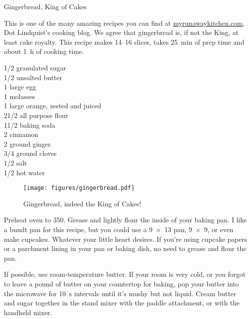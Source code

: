 \begin{entry}{Gingerbread, King of Cakes}

\begin{open}
    This is one of the many amazing recipes you can find at
    \url{myrunawaykitchen.com}, Dot Lindquist's cooking blog.  We agree that
    gingerbread is, if not the King, at least cake royalty.  This recipe makes
    \numrange{14}{16} slices, takes \SI{25}{\minute} of prep time and about
    \SI{1}{\hour} of cooking time.
\end{open}
\begin{ingredients}
    \SI{1/2}{\cup}  granulated sugar\\
    \SI{1/2}{\cup}  unsalted butter\\
    1 large egg\\
    \SI{1}{\cup} molasses\\
    1 large orange, zested and juiced\\
    2\SI{1/2}{\cup}  all purpose flour\\
    1\SI{1/2}{\teaspoon}  baking soda\\
    \SI{2}{\teaspoon} cinnamon\\
    \SI{2}{\teaspoon} ground ginger\\
    \SI{3/4}{\teaspoon}   ground cloves\\
    \SI{1/2}{\teaspoon}  salt\\
    \SI{1/2}{\cup}  hot water
\end{ingredients}
\begin{figure}
    \centering
    \texttt{[image: figures/gingerbread.pdf]}
    \caption{Gingerbread, indeed the King of Cakes!}
\end{figure}
Preheat oven to \SI{350}{\degreeF}. Grease and lightly flour the inside of your
baking pan. I like a bundt pan for this recipe, but you could use a
\SI{9x13}{\inch} pan, \SI{9x9}{\inch}, or even make cupcakes. Whatever your
little heart desires. If you're using cupcake papers or a parchment lining in
your pan or baking dish, no need to grease and flour the pan.

If possible, use room-temperature butter. If your room is very cold, or you
forgot to leave a pound of butter on your countertop for baking, pop your butter
into the microwave for \SI{10}{\second} intervals until it's mushy but not
liquid. Cream butter and sugar together in the stand mixer with the paddle
attachment, or with the handheld mixer.


\end{entry}
